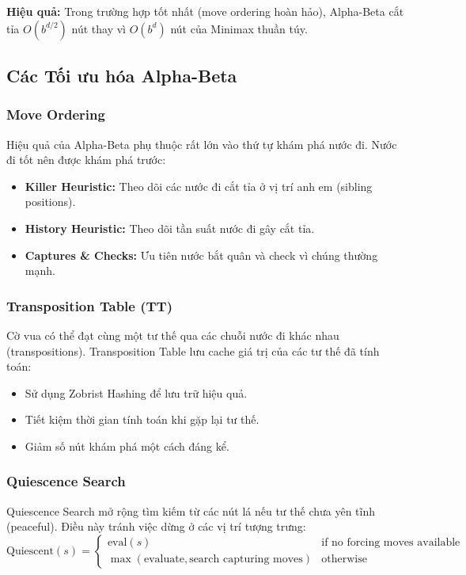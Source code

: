 \textbf{Hiệu quả:} Trong trường hợp tốt nhất (move ordering hoàn hảo), Alpha-Beta cắt tỉa $O(b^{d/2})$ nút thay vì $O(b^d)$ nút của Minimax thuần túy.

\subsection{Các Tối ưu hóa Alpha-Beta}

\subsubsection{Move Ordering}
Hiệu quả của Alpha-Beta phụ thuộc rất lớn vào thứ tự khám phá nước đi. Nước đi tốt nên được khám phá trước:
\begin{itemize}
    \item \textbf{Killer Heuristic:} Theo dõi các nước đi cắt tỉa ở vị trí anh em (sibling positions).
    \item \textbf{History Heuristic:} Theo dõi tần suất nước đi gây cắt tỉa.
    \item \textbf{Captures \& Checks:} Ưu tiên nước bắt quân và check vì chúng thường mạnh.
\end{itemize}

\subsubsection{Transposition Table (TT)}
Cờ vua có thể đạt cùng một tư thế qua các chuỗi nước đi khác nhau (transpositions). Transposition Table lưu cache giá trị của các tư thế đã tính toán:
\begin{itemize}
    \item Sử dụng Zobrist Hashing để lưu trữ hiệu quả.
    \item Tiết kiệm thời gian tính toán khi gặp lại tư thế.
    \item Giảm số nút khám phá một cách đáng kể.
\end{itemize}

\subsubsection{Quiescence Search}
Quiescence Search mở rộng tìm kiếm từ các nút lá nếu tư thế chưa yên tĩnh (peaceful). Điều này tránh việc dừng ở các vị trí tượng trưng:
\begin{equation*}
\text{Quiescent}(s) = \begin{cases}
\text{eval}(s) & \text{if no forcing moves available} \\
\max(\text{evaluate}, \text{search capturing moves}) & \text{otherwise}
\end{cases}
\end{equation*}

